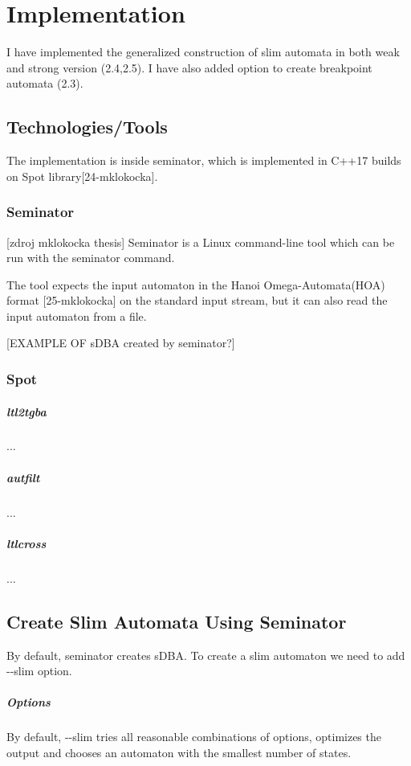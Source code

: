 \documentclass[
	digital
nolof, nolot
]{fithesis3}
\begin{document}
			
	\chapter{Implementation}
		I have implemented the generalized construction of slim automata in both weak and strong version (2.4,2.5). I have also added option to create breakpoint automata (2.3).
		
		\section{Technologies/Tools}
		The implementation is inside seminator, which is implemented in C++17 builds on Spot library[24-mklokocka].
		\subsection{Seminator} [zdroj mklokocka thesis] 
		Seminator is a Linux command-line tool which can be run with the seminator command.
		
		The tool expects the input automaton in the Hanoi Omega-Automata(HOA) format [25-mklokocka] on the standard input stream, but it can also read the input automaton from a file.
		
		[EXAMPLE OF sDBA created by seminator?]
		
	\subsection{Spot}
			\paragraph{ltl2tgba}...
	\paragraph{autfilt}...
	\paragraph{ltlcross}...
		\section{Create Slim Automata Using Seminator}
		By default, seminator creates sDBA. To create a slim automaton we need to add -{}-slim option. 
		\paragraph{Options} By default, -{}-slim tries all reasonable combinations of options, optimizes the output and chooses an automaton with the smallest number of states.
		
\end{document}
